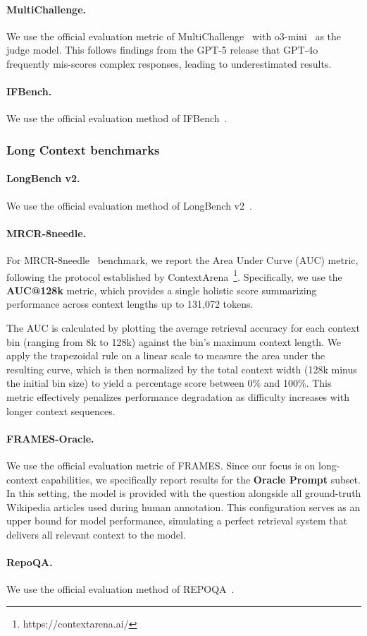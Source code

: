 \paragraph{MultiChallenge.} We use the official evaluation metric of MultiChallenge~\cite{sirdeshmukh2025multichallengerealisticmultiturnconversation} with o3-mini~\cite{o3-mini} as the judge model. This follows findings from the GPT-5\cite{gpt5} release that GPT-4o~\cite{openai2024gpt4technicalreport} frequently mis-scores complex responses, leading to underestimated results.

\paragraph{IFBench.} We use the official evaluation method of IFBench~\cite{pyatkin2025generalizing}.


\subsubsection{Long Context benchmarks}

\paragraph{LongBench v2.} We use the official evaluation method of LongBench v2~\cite{bai2024longbenchv2}.

\paragraph{MRCR-8needle.} For MRCR-8needle~\cite{vodrahalli2024michelangelo} benchmark, we report the Area Under Curve (AUC) metric, following the protocol established by ContextArena~\footnote{https://contextarena.ai/}. Specifically, we use the \textbf{AUC@128k} metric, which provides a single holistic score summarizing performance across context lengths up to 131,072 tokens.

The AUC is calculated by plotting the average retrieval accuracy for each context bin (ranging from 8k to 128k) against the bin's maximum context length. We apply the trapezoidal rule on a linear scale to measure the area under the resulting curve, which is then normalized by the total context width (128k minus the initial bin size) to yield a percentage score between 0\% and 100\%. This metric effectively penalizes performance degradation as difficulty increases with longer context sequences.

\paragraph{FRAMES-Oracle.} We use the official evaluation metric of FRAMES\cite{krishna2025fact}. Since our focus is on long-context capabilities, we specifically report results for the \textbf{Oracle Prompt} subset. In this setting, the model is provided with the question alongside all ground-truth Wikipedia articles used during human annotation. This configuration serves as an upper bound for model performance, simulating a perfect retrieval system that delivers all relevant context to the model.

\paragraph{RepoQA.} We use the official evaluation method of REPOQA~\cite{liu2024repoqaevaluatinglongcontext}.

